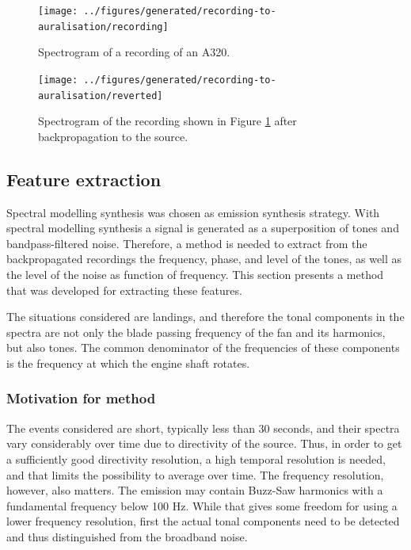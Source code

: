 \begin{figure}[H]
  \centering
  \texttt{[image: ../figures/generated/recording-to-auralisation/recording]}
  \caption{
    Spectrogram of a recording of an A320. }
  \label{fig:recording}
\end{figure}

\begin{figure}[H]
  \centering
  \texttt{[image: ../figures/generated/recording-to-auralisation/reverted]}
  \caption{Spectrogram of the recording shown in Figure \ref{fig:recording} after backpropagation to the source.}
  \label{fig:backpropagated}
\end{figure}

\subsection{Feature extraction}
Spectral modelling synthesis was chosen as emission synthesis strategy. With
spectral modelling synthesis a signal is generated as a superposition of tones
and bandpass-filtered noise.
Therefore, a method is needed to extract from the backpropagated recordings the
frequency, phase, and level of the tones, as well as the level of the noise as
function of frequency. This section presents a method that was developed for
extracting these features.

The situations considered are landings, and therefore the tonal components in
the spectra are not only the blade passing frequency of the fan and its
harmonics, but also  tones. The common denominator of the
frequencies of these components is the frequency at which the engine shaft
rotates.

\subsubsection*{Motivation for method}
The events considered are short, typically less than 30 seconds, and their
spectra vary considerably over time due to directivity of the source. Thus, in
order to get a sufficiently good directivity resolution, a high temporal
resolution is needed, and that limits the possibility to average over time. The
frequency resolution, however, also matters. The emission may contain Buzz-Saw
harmonics with a fundamental frequency below 100 Hz. While that gives some
freedom for using a lower frequency resolution, first the actual tonal
components need to be detected and thus distinguished from the broadband noise.

